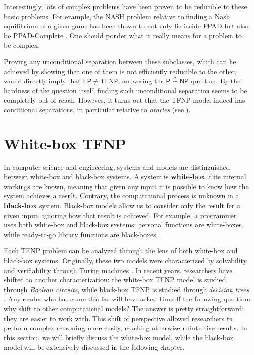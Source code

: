 Interestingly, lots of complex problems have been proven to be reducible to these basic problems. For example, the $\mathrm{NASH}$ problem relative to finding a Nash equilibrium of a given game has been shown to not only lie inside \textsf{PPAD} but also be \textsf{PPAD}-Complete \cite{nash_1, nash_2}. One should ponder what it really means for a problem to be complex.

Proving any unconditional separation between these subclasses, which can be achieved by showing that one of them is not efficiently reducible to the other, would directly imply that $\mathsf{FP} \neq \mathsf{TFNP}$, answering the $\mathsf{P} \stackrel{?}{=} \mathsf{NP}$ question. By the hardness of the question itself, finding such unconditional separation seems to be completely out of reach. However, it turns out that the \textsf{TFNP} model indeed has conditional separations, in particular relative to \textit{oracles} (see ).
 
\newpage

\section{White-box \textsf{TFNP}}

In computer science and engineering, systems and models are distinguished between white-box and black-box systems. A system is \textbf{white-box} if its internal workings are known, meaning that given any input it is possible to know how the system achieves a result. Contrary, the computational process is unknown in a \textbf{black-box} system. Black-box models allow us to consider only the result for a given input, ignoring how that result is achieved. For example, a programmer uses both white-box and black-box systems: personal functions are white-boxes, while ready-to-go library functions are black-boxes.

Each \textsf{TFNP} problem can be analyzed through the lens of both white-box and black-box systems. Originally, these two models were characterized by solvability and verifiability through Turing machines \cite{decision_vs_search,rel_comp_np_search}. In recent years, researchers have shifted to another characterization: the white-box \textsf{TFNP} model is studied through \textit{Boolean circuits}, while black-box \textsf{TFNP} is studied through \textit{decision trees} \cite{separations_proof_complexity, adventures_monotone_tfnp, tfnp_characterization}. Any reader who has come this far will have asked himself the following question: why shift to other computational models? The answer is pretty straightforward: they are easier to work with. This shift of perspective allowed researchers to perform complex reasoning more easily, reaching otherwise unintuitive results. In this section, we will briefly discuss the white-box model, while the black-box model will be extensively discussed in the following chapter. 

